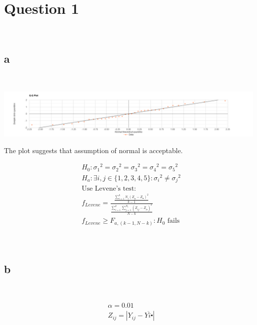 \documentclass{article}
\begin{document}
\section*{Question 1}

~

\subsection*{a}

~

\includegraphics[scale=0.18]{1a.png}

The plot suggests that assumption of normal is acceptable.

\begin{align*}
    &H_0:{\sigma_1}^2={\sigma_2}^2={\sigma_3}^2={\sigma_4}^2={\sigma_5}^2\\
    &H_a:\exists i,j\in\{1,2,3,4,5\}:{\sigma_i}^2\ne{\sigma_j}^2\\
    &\text{Use Levene's test}:\\
    &f_{Levene}=\frac{\frac{\sum_{i=1}^{k}N_i(Z_{i\centerdot }-Z_{\centerdot \centerdot })^2}{k-1}}{\frac{\sum_{i=1}^{k}\sum_{j=1}^{N_1}(Z_{ij }-Z_{i \centerdot })^2}{N-k}}\\
    &f_{Levene}\geqslant F_{a,(k-1,N-k)}:H_0\text{ fails}\\
\end{align*}

~

\subsection*{b}

~

\begin{align*}
    &\alpha=0.01\\
    &Z_{ij}=|Y_{ij}-\overline{Y{i\centerdot}}|\\
    &\\
\end{align*}
\end{document}
